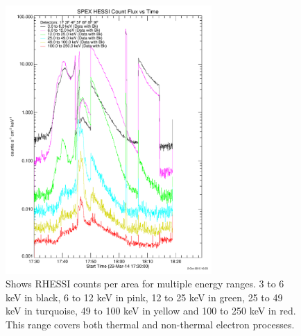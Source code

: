 \begin{figure}[H]
  \begin{center}
  \includegraphics[width=0.7\textwidth]{count-flux-v-time-crop}
  \end{center}
  \caption{Shows RHESSI counts per area for multiple energy ranges. 3 to 6 keV in black, 6 to 12 keV in pink, 12 to 25 keV in green, 25 to 49 keV in turquoise, 49 to 100 keV in yellow and 100 to 250 keV in red. This range covers both thermal and non-thermal electron processes.}\label{rhessicft}
\end{figure}

